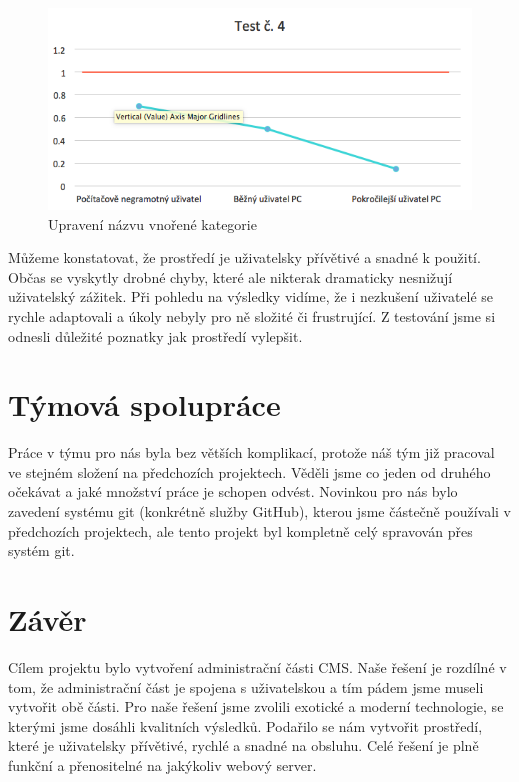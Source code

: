 \documentclass[11pt,a4paper]{article}
\begin{document}
\begin{figure}[!ht]
    \centering
    \includegraphics[width=\textwidth]{t4.png}
    \caption{Upravení názvu vnořené kategorie}
\end{figure}


Můžeme konstatovat, že prostředí je uživatelsky přívětivé a snadné k použití. Občas se vyskytly drobné chyby, které ale nikterak dramaticky nesnižují uživatelský zážitek. Při pohledu na výsledky vidíme, že i nezkušení uživatelé se rychle adaptovali a úkoly nebyly pro ně složité či frustrující. Z testování jsme si odnesli důležité poznatky jak prostředí vylepšit.


\section*{Týmová spolupráce}
Práce v týmu pro nás byla bez větších komplikací, protože náš tým již pracoval ve stejném složení na předchozích projektech. Věděli jsme co jeden od druhého očekávat a jaké množství práce je schopen odvést. Novinkou pro nás bylo zavedení systému git\cite{git} (konkrétně služby GitHub), kterou jsme částečně používali v předchozích projektech, ale tento projekt byl kompletně celý spravován přes systém git.


\section*{Závěr}
Cílem projektu bylo vytvoření administrační části CMS. Naše řešení je rozdílné v tom, že administrační část je spojena s uživatelskou a tím pádem jsme museli vytvořit obě části. Pro naše řešení jsme zvolili exotické a moderní technologie, se kterými jsme dosáhli kvalitních výsledků. Podařilo se nám vytvořit prostředí, které je uživatelsky přívětivé, rychlé a snadné na obsluhu. Celé řešení je plně funkční a přenositelné na jakýkoliv webový server.
\end{document}
